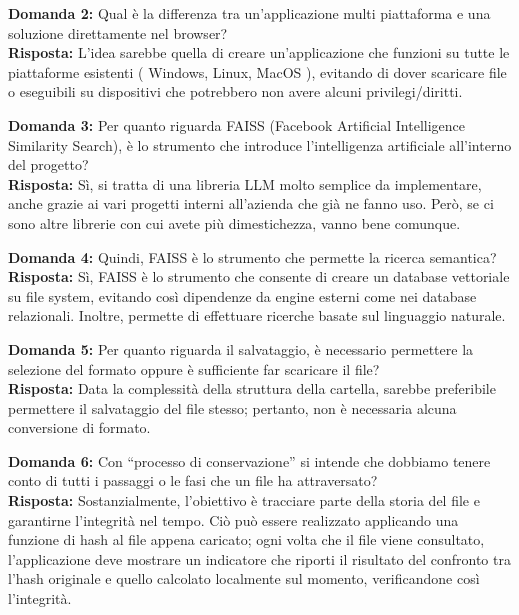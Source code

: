 \documentclass[a4paper,12pt]{article}
\begin{document}
\textbf{Domanda 2:} Qual è la differenza tra un'applicazione multi piattaforma e una soluzione direttamente nel browser?\\[0.5em]
\textbf{Risposta:} L'idea sarebbe quella di creare un'applicazione che funzioni su tutte le piattaforme esistenti ( Windows, Linux, MacOS ), evitando di dover scaricare file o eseguibili su dispositivi che potrebbero non avere alcuni privilegi/diritti.

\vspace{2em}

\textbf{Domanda 3:} Per quanto riguarda FAISS (Facebook Artificial Intelligence Similarity Search), è lo strumento che introduce l’intelligenza artificiale all’interno del progetto?\\[0.5em]
\textbf{Risposta:} Sì, si tratta di una libreria LLM molto semplice da implementare, anche grazie ai vari progetti interni all’azienda che già ne fanno uso. Però, se ci sono altre librerie con cui avete più dimestichezza, vanno bene comunque.

\vspace{2em}

\textbf{Domanda 4:} Quindi, FAISS è lo strumento che permette la ricerca semantica?\\[0.5em]
\textbf{Risposta:} Sì, FAISS è lo strumento che consente di creare un database vettoriale su file system, evitando così dipendenze da engine esterni come nei database relazionali. Inoltre, permette di effettuare ricerche basate sul linguaggio naturale.

\vspace{2em}

\textbf{Domanda 5:} Per quanto riguarda il salvataggio, è necessario permettere la selezione del formato oppure è sufficiente far scaricare il file?\\[0.5em]
\textbf{Risposta:} Data la complessità della struttura della cartella, sarebbe preferibile permettere il salvataggio del file stesso; pertanto, non è necessaria alcuna conversione di formato.

\vspace{2em}

\textbf{Domanda 6:} Con “processo di conservazione” si intende che dobbiamo tenere conto di tutti i passaggi o le fasi che un file ha attraversato?\\[0.5em]
\textbf{Risposta:} Sostanzialmente, l'obiettivo è tracciare parte della storia del file e garantirne l'integrità nel tempo. Ciò può essere realizzato applicando una funzione di hash al file appena caricato; ogni volta che il file viene consultato, l'applicazione deve mostrare un indicatore che riporti il risultato del confronto tra l’hash originale e quello calcolato localmente sul momento, verificandone così l'integrità.
\end{document}
